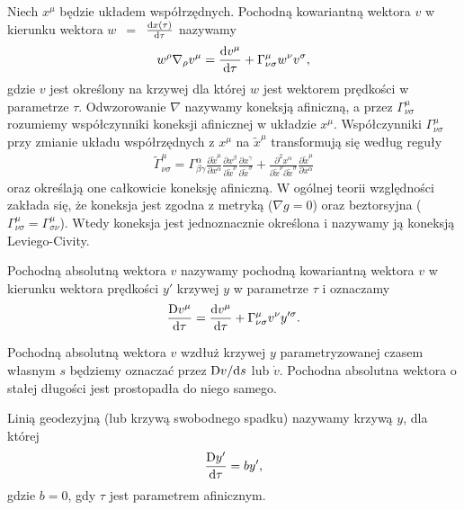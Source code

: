 \begin{definition}
Niech $x^\mu$ będzie układem współrzędnych. 
Pochodną kowariantną wektora $v$ w kierunku wektora 
$w$~$=$~$\frac{\text{d} x(\tau)}{\text{d} \tau}$ nazywamy
\begin{align*}
w^\rho \nabla_\rho v^\mu = \frac{\text{d} v^\mu}{\text{d} \tau}
+ \Gamma^\mu_{\nu\sigma} w^\nu v^\sigma ,
\end{align*}
gdzie $v$ jest określony na krzywej dla której $w$ 
jest wektorem prędkości w parametrze $\tau$. Odwzorowanie 
$\nabla$ nazywamy koneksją afiniczną, a 
przez $\Gamma^\mu_{\nu\sigma} $
rozumiemy współczynniki koneksji afinicznej w układzie $x^\mu$. 
Współczynniki $\Gamma^\mu_{\nu\sigma}$ przy zmianie układu współrzędnych z $x^\mu$
na $\tilde{x}^\mu$
transformują się według reguły
\begin{align*}
\tilde{\Gamma}^\mu_{\nu\sigma} = \Gamma^\alpha_{\beta\gamma}
\frac{\partial \tilde{x}^\mu}{\partial x^\alpha }
\frac{\partial x^\beta}{\partial \tilde{x}^\nu }
\frac{\partial x^\gamma}{\partial \tilde{x}^\sigma }
+
\frac{\partial^2 x^\alpha}{\partial \tilde{x}^\nu \partial \tilde{x}^\sigma }
\frac{\partial \tilde{x}^\mu}{\partial x^\alpha }
\end{align*} 
oraz określają one całkowicie koneksję afiniczną.
W ogólnej teorii względności 
zakłada się, że koneksja jest zgodna z metryką ($\nabla g =0$) oraz
 beztorsyjna ($\Gamma^\mu_{\nu\sigma} 
        = \Gamma^\mu_{\sigma\nu}$).
Wtedy koneksja jest jednoznacznie określona i nazywamy ją
 koneksją Leviego-Civity. 
\end{definition}
\begin{definition}
Pochodną absolutną wektora $v$ nazywamy
pochodną kowariantną wektora $v$ w kierunku wektora prędkości
$y'$ krzywej $y$ w parametrze $\tau$ 
 i oznaczamy 
\begin{align*}
\frac{\text{D} v^\mu }{\text{d} \tau } = \frac{\text{d} v^\mu}{\text{d} \tau}
+ \Gamma^\mu_{\nu\sigma} v^\nu y'^\sigma.
\end{align*}
\end{definition}\noindent
Pochodną absolutną wektora $v$ wzdłuż krzywej $y$
parametryzowanej czasem własnym $s$
będziemy oznaczać przez $\text{D} v/\text{d} s$ lub $\dot{v}$. 
Pochodna absolutna wektora o stałej długości 
jest prostopadła do niego samego.
\begin{definition}
Linią geodezyjną (lub krzywą swobodnego spadku) nazywamy 
krzywą $y$, dla której
\begin{align*}
\frac{\text{D} y'}{\text{d} \tau } = b y',
\end{align*} 
gdzie $b=0$, gdy $\tau$ jest parametrem afinicznym.
\end{definition}
